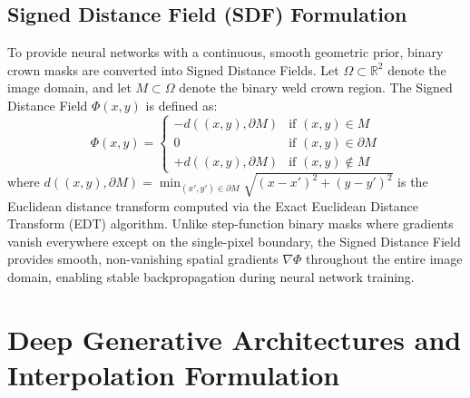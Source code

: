 \documentclass[12pt,a4paper,oneside]{report}
\begin{document}
\section{Signed Distance Field (SDF) Formulation}
To provide neural networks with a continuous, smooth geometric prior, binary crown masks are converted into Signed Distance Fields. Let $\Omega \subset \mathbb{R}^2$ denote the image domain, and let $M \subset \Omega$ denote the binary weld crown region. The Signed Distance Field $\Phi(x, y)$ is defined as:
\begin{equation}\label{eq:sdf}
    \Phi(x, y) = \begin{cases}
        -d((x, y), \partial M) & \text{if } (x, y) \in M \\
        0 & \text{if } (x, y) \in \partial M \\
        +d((x, y), \partial M) & \text{if } (x, y) \notin M
    \end{cases}
\end{equation}
where $d((x, y), \partial M) = \min_{(x', y') \in \partial M} \sqrt{(x - x')^2 + (y - y')^2}$ is the Euclidean distance transform computed via the Exact Euclidean Distance Transform (EDT) algorithm. Unlike step-function binary masks where gradients vanish everywhere except on the single-pixel boundary, the Signed Distance Field provides smooth, non-vanishing spatial gradients $\nabla \Phi$ throughout the entire image domain, enabling stable backpropagation during neural network training.

\chapter{Deep Generative Architectures and Interpolation Formulation}
\label{ch:architectures}
\end{document}
